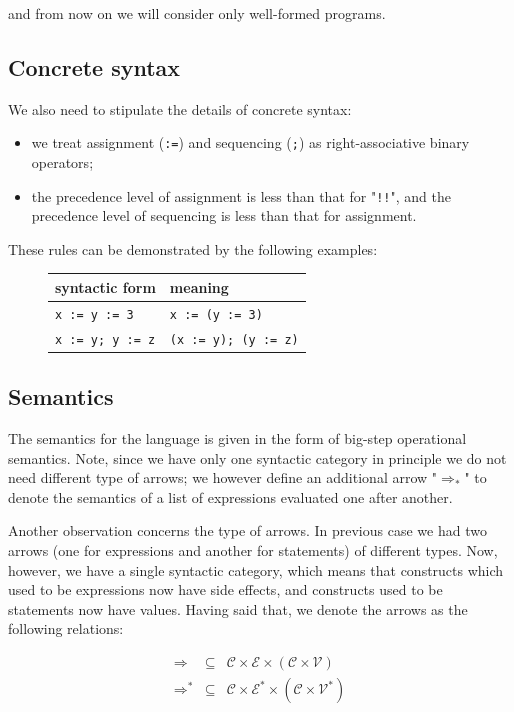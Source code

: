\documentclass{article}
\newcommand{\llang}[1]{\mbox{\lstinline[mathescape]|#1|}}
\theoremstyle{definition}
\begin{document}
and from now on we will consider only well-formed programs.

\subsection{Concrete syntax}

We also need to stipulate the details of concrete syntax:

\begin{itemize}
\item we treat assignment (\llang{:=}) and sequencing (\llang{;}) as right-associative binary operators;
\item the precedence level of assignment is less than that for "\llang{!!}", and the precedence level of sequencing is less than that for
  assignment.
\end{itemize}

These rules can be demonstrated by the following examples:

\begin{figure}[h]
\begin{tabular}{ll}
  syntactic form & meaning \\
  \hline
  \llang{x := y := 3}    & \llang{x := (y := 3)}      \\
  \llang{x := y; y := z} & \llang{(x := y); (y := z)} \\
\end{tabular}
\end{figure}

\subsection{Semantics}

The semantics for the language is given in the form of big-step operational semantics. Note, since we have only one syntactic category in principle we do
not need different type of arrows; we however define an additional arrow "$\Rightarrow_*$" to denote the semantics of a list of expressions
evaluated one after another.

Another observation concerns the type of arrows. In previous case we had two arrows (one for expressions and another for statements) of different types.
Now, however, we have a single syntactic category, which means that constructs which used to be expressions now have side effects, and
constructs used to be statements now have values. Having said that, we denote the arrows as the following relations:

\[
\begin{array}{rcl}
  \Rightarrow & \subseteq & \mathscr{C} \times \mathscr{E} \times (\mathscr{C}\times\mathscr{V})\\
  \Rightarrow^* & \subseteq & \mathscr{C} \times \mathscr{E}^* \times (\mathscr{C}\times\mathscr{V}^*)
\end{array}
\]
\end{document}
